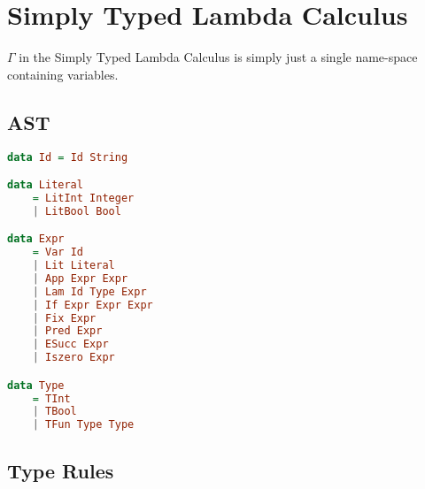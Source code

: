 \section{Simply Typed Lambda Calculus}
$\Gamma$ in the Simply Typed Lambda Calculus is simply just a single name-space containing variables.
\subsection{AST}
\begin{lstlisting}[language=Haskell]
data Id = Id String

data Literal 
    = LitInt Integer
    | LitBool Bool

data Expr 
    = Var Id
    | Lit Literal
    | App Expr Expr
    | Lam Id Type Expr
    | If Expr Expr Expr
    | Fix Expr
    | Pred Expr
    | ESucc Expr
    | Iszero Expr

data Type
    = TInt
    | TBool
    | TFun Type Type

\end{lstlisting}

\subsection{Type Rules}

